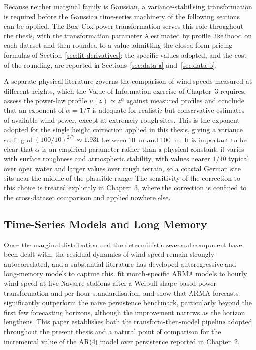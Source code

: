 \documentclass[11pt, a4paper, twoside]{article}
\begin{document}
Because neither marginal family is Gaussian, a variance-stabilising transformation is required before the Gaussian time-series machinery of the following sections can be applied. The Box--Cox power transformation serves this role throughout the thesis, with the transformation parameter $\lambda$ estimated by profile likelihood on each dataset and then rounded to a value admitting the closed-form pricing formulas of Section~\ref{sec:lit-derivatives}; the specific values adopted, and the cost of the rounding, are reported in Sections~\ref{sec:data-a} and~\ref{sec:data-b}.

A separate physical literature governs the comparison of wind speeds measured at different heights, which the Value of Information exercise of Chapter~3 requires. \citet{PetersonHennessey1978} assess the power-law profile $u(z) \propto z^{\alpha}$ against measured profiles and conclude that an exponent of $\alpha = 1/7$ is adequate for realistic but conservative estimates of available wind power, except at extremely rough sites. This is the exponent adopted for the single height correction applied in this thesis, giving a variance scaling of $(100/10)^{2/7} \approx 1.931$ between 10~m and 100~m. It is important to be clear that $\alpha$ is an empirical parameter rather than a physical constant: it varies with surface roughness and atmospheric stability, with values nearer $1/10$ typical over open water and larger values over rough terrain, so a coastal German site sits near the middle of the plausible range. The sensitivity of the correction to this choice is treated explicitly in Chapter~3, where the correction is confined to the cross-dataset comparison and applied nowhere else.

\subsection{Time-Series Models and Long Memory}
\label{sec:lit-timeseries}

Once the marginal distribution and the deterministic seasonal component have been dealt with, the residual dynamics of wind speed remain strongly autocorrelated, and a substantial literature has developed autoregressive and long-memory models to capture this. \citet{Torres2005} fit month-specific ARMA models to hourly wind speed at five Navarre stations after a Weibull-shape-based power transformation and per-hour standardisation, and show that ARMA forecasts significantly outperform the naive persistence benchmark, particularly beyond the first few forecasting horizons, although the improvement narrows as the horizon lengthens. This paper establishes both the transform-then-model pipeline adopted throughout the present thesis and a natural point of comparison for the incremental value of the AR(4) model over persistence reported in Chapter~2.
\end{document}
